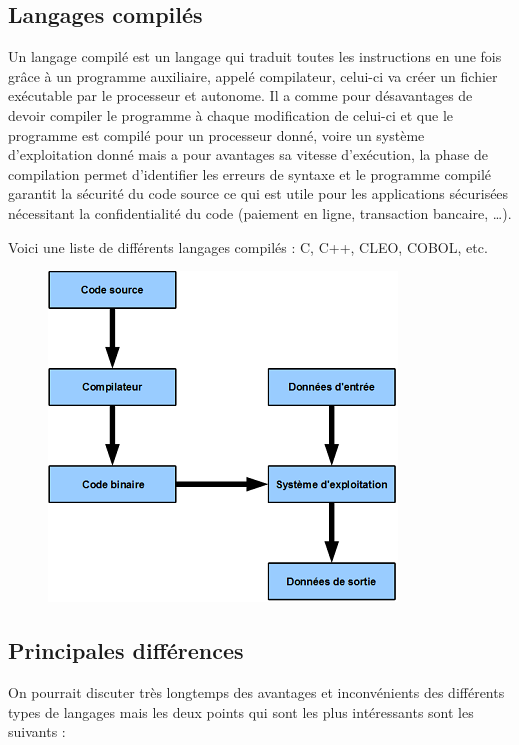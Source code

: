 \documentclass[a4paper,12pt]{article} %
\begin{document}
\subsection{Langages compilés}

Un langage compilé est un langage qui traduit toutes les instructions en une fois grâce à un programme auxiliaire, appelé compilateur, celui-ci va créer un fichier exécutable par le processeur et autonome.
Il a comme pour désavantages de devoir compiler le programme à chaque modification de celui-ci et que le programme est compilé pour un processeur donné, voire un système d’exploitation donné mais a pour avantages sa vitesse d’exécution, la phase de compilation permet d’identifier les erreurs de syntaxe et le programme compilé garantit la sécurité du code source ce qui est utile pour les applications sécurisées nécessitant la confidentialité du code (paiement en ligne, transaction bancaire, …).

Voici une liste de différents langages compilés : C, C++, CLEO, COBOL, etc.
\begin{figure}[h] %
  \centering %
  \includegraphics[scale=1]{compile.png} %
\end{figure}

\subsection{Principales différences}

On pourrait discuter très longtemps des avantages et inconvénients des différents types de langages mais les deux points qui sont les plus intéressants sont les suivants :
\end{document}
